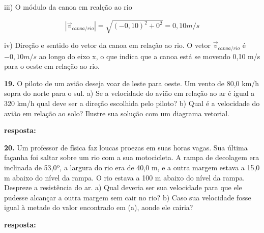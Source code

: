 \documentclass[a4paper, 12pt]{article}
\begin{document}
\begin{flushleft}
		iii) O módulo da canoa em realção ao rio
		
		\begin{equation*}
			|\vec{v}_{canoa/rio}| = \sqrt{(-0,10)^2 + 0^2} = 0,10m/s
		\end{equation*}
		
		iv) Direção e sentido do vetor da canoa em relação ao rio. O vetor $\vec{v}_{canoa/rio}$ é $-0,10m/s$ ao longo do eixo x, o que indica que a canoa está se movendo 0,10 m/s para o oeste em relação ao rio.
		
		\vspace{2em}
		
		\textbf{19.} O piloto de um avião deseja voar de leste para oeste. Um vento de 80,0 km/h sopra do norte para o sul. a) Se a velocidade do avião em relação ao ar é igual a 320 km/h qual deve ser a direção escolhida pelo piloto? b) Qual é a velocidade do avião em relação ao solo? Ilustre sua solução com um diagrama vetorial.
		
		\textbf{resposta:}
		
		\vspace{2em}
		
		\textbf{20.}  Um professor de física faz loucas proezas em suas horas vagas. Sua última façanha foi saltar sobre um rio com a sua motocicleta. A rampa de decolagem era inclinada de 53,0º, a largura do rio era de 40,0 m, e a outra margem estava a 15,0 m abaixo do nível da rampa. O rio estava a 100 m abaixo do nível da rampa. Despreze a resistência do ar. a) Qual deveria ser sua velocidade para que ele pudesse alcançar a outra margem sem cair no rio? b) Caso sua velocidade fosse igual à metade do valor encontrado em (a), aonde ele cairia?
		
		\textbf{resposta:}
	\end{flushleft}
\end{document}
